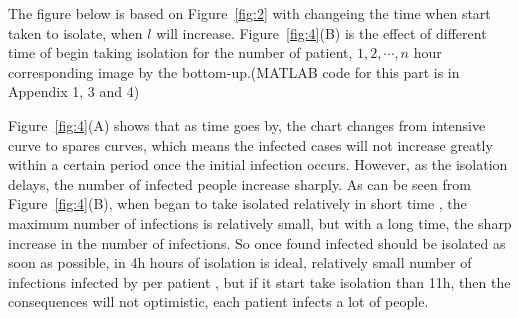 The figure below is based on Figure~\ref{fig:2} with changeing
the time when start taken to isolate, when $l$ will increase.
Figure~\ref{fig:4}(B) is the effect of different time of begin taking 
isolation for the number of patient, $1,2,\cdots,n$ hour
corresponding image by the bottom-up.(MATLAB code for this part
is in Appendix 1, 3 and 4)\par
Figure~\ref{fig:4}(A) shows that as time goes by, the chart
changes from intensive curve to spares curves, which means the
infected cases will not increase greatly within a certain
period once the initial infection occurs. 
However, as the isolation delays, the number of infected people
increase sharply.
As can be seen from Figure~\ref{fig:4}(B), when began to take
isolated relatively in short time , the maximum number of
infections is relatively small, but with a long time, the sharp
increase in the number of infections. So once found infected
should be isolated as soon as possible, in 4h hours of isolation
is ideal, relatively small number of infections infected by per
patient \cite{bib3}, but if it start take isolation than 11h,
then the consequences will not optimistic, each patient infects
a lot of people.


